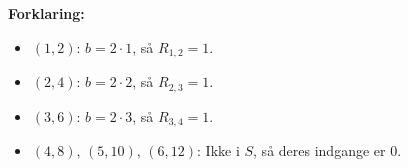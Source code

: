 \documentclass{article}
\begin{document}
\textbf{Forklaring:}
\begin{itemize}
    \item \((1, 2)\): \( b = 2 \cdot 1 \), så \( R_{1,2} = 1 \).
    \item \((2, 4)\): \( b = 2 \cdot 2 \), så \( R_{2,3} = 1 \).
    \item \((3, 6)\): \( b = 2 \cdot 3 \), så \( R_{3,4} = 1 \).
    \item \((4, 8)\), \((5, 10)\), \((6, 12)\): Ikke i \( S \), så deres indgange er 0.
\end{itemize}
\end{document}
